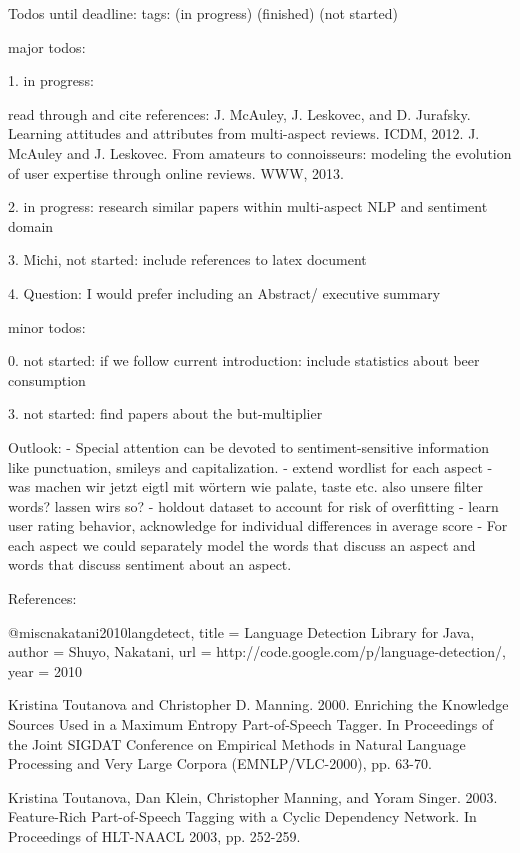 
Todos until deadline: tags: (in progress) (finished) (not started)

major todos:

1. in progress: 

read through and cite references: 
    J. McAuley, J. Leskovec, and D. Jurafsky. Learning attitudes and attributes from multi-aspect reviews. ICDM, 2012.
    J. McAuley and J. Leskovec. From amateurs to connoisseurs: modeling the evolution of user expertise through online reviews. WWW, 2013.

2. in progress: research similar papers within multi-aspect NLP and sentiment domain 

3. Michi, not started: include references to latex document

4. Question: I would prefer including an Abstract/ executive summary





minor todos:

0. not started: if we follow current introduction: include statistics about beer consumption

3. not started: find papers about the but-multiplier




Outlook: 
- Special attention can be devoted to sentiment-sensitive information like punctuation, smileys and capitalization.
- extend wordlist for each aspect
- was machen wir jetzt eigtl mit wörtern wie palate, taste etc. also unsere filter words? lassen wirs so?
- holdout dataset to account for risk of overfitting
- learn user rating behavior, acknowledge for individual differences in average score
- For each aspect we could separately model the words that discuss an aspect and words that discuss sentiment about an aspect.




References:

@misc{nakatani2010langdetect,
  title  = {Language Detection Library for Java},
  author = {Shuyo, Nakatani},
  url    = {http://code.google.com/p/language-detection/},
  year   = {2010}
}


Kristina Toutanova and Christopher D. Manning. 2000. Enriching the Knowledge Sources Used in a Maximum Entropy Part-of-Speech Tagger. In Proceedings of the Joint SIGDAT Conference on Empirical Methods in Natural Language Processing and Very Large Corpora (EMNLP/VLC-2000), pp. 63-70.


Kristina Toutanova, Dan Klein, Christopher Manning, and Yoram Singer. 2003. Feature-Rich Part-of-Speech Tagging with a Cyclic Dependency Network. In Proceedings of HLT-NAACL 2003, pp. 252-259.






